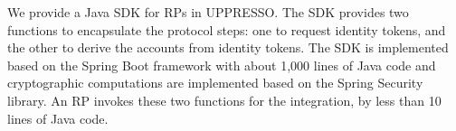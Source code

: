 


We provide a Java SDK for RPs in UPPRESSO.
The SDK provides two functions to encapsulate the protocol steps:
 one to request identity tokens,
    and the other to derive the accounts from identity tokens.
\textcolor[rgb]{1.00,0.00,0.00}{The SDK is implemented based on the Spring Boot framework  with about 1,000 lines of Java code
 and cryptographic computations are implemented based on the Spring Security library.}
An RP invokes these two functions for the integration,
    by less than 10 lines of Java code.



